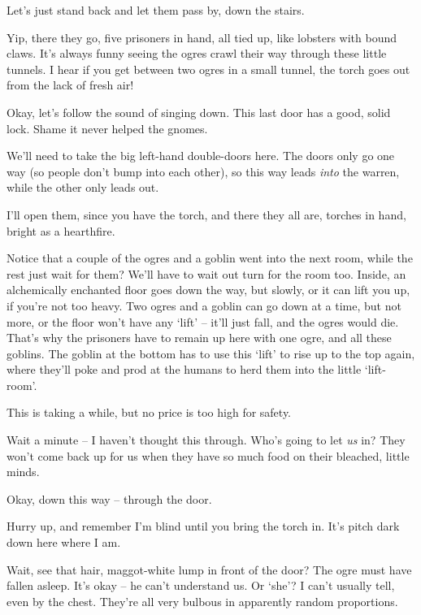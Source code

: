 \begin{multicols}{2}
\begin{exampletext}
Let's just stand back and let them pass by, down the stairs.

Yip, there they go, five prisoners in hand, all tied up, like lobsters with bound claws.
It's always funny seeing the ogres crawl their way through these little tunnels.
I hear if you get between two ogres in a small tunnel, the torch goes out from the lack of fresh air!

Okay, let's follow the sound of singing down.
This last door has a good, solid lock.
Shame it never helped the gnomes.

We'll need to take the big left-hand double-doors here.
The doors only go one way (so people don't bump into each other), so this way leads \emph{into} the warren, while the other only leads out.

I'll open them, since you have the torch, and there they all are, torches in hand, bright as a hearthfire.

Notice that a couple of the ogres and a goblin went into the next room, while the rest just wait for them?
We'll have to wait out turn for the room too.
Inside, an alchemically enchanted floor goes down the way, but slowly, or it can lift you up, if you're not too heavy.
Two ogres and a goblin can go down at a time, but not more, or the floor won't have any `lift' -- it'll just fall, and the ogres would die.
That's why the prisoners have to remain up here with one ogre, and all these goblins.
The goblin at the bottom has to use this `lift' to rise up to the top again, where they'll poke and prod at the humans to herd them into the little `lift-room'.

This is taking a while, but no price is too high for safety.


Wait a minute -- I haven't thought this through.
Who's going to let \emph{us} in?
They won't come back up for us when they have so much food on their bleached, little minds.

Okay, down this way -- through the door.

Hurry up, and remember I'm blind until you bring the torch in.
It's pitch dark down here where I am.

Wait, see that hair, maggot-white lump in front of the door?
The ogre must have fallen asleep.
It's okay -- he can't understand us.
Or `she'?
I can't usually tell, even by the chest.
They're all very bulbous in apparently random proportions.


\end{exampletext}
\end{multicols}
